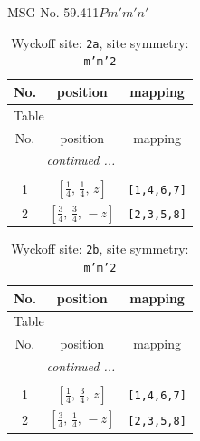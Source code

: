 \documentclass[fleqn,8pt]{jsarticle}
\begin{document}
\setcounter{MaxMatrixCols}{32}

\renewcommand{\tablename}{Table~}
\renewcommand{\figurename}{Figure~}
\begin{center}
\LARGE
MSG No. 59.411\quad$Pm'm'n'$
\end{center}
\renewcommand{\arraystretch}{1.2}
\begin{longtable}{ccc}
\caption{Wyckoff site: {\tt 2a}, site symmetry: {\tt m'm'2}}
 \\
 \hline \hline
No. & position & mapping \\ \hline \endfirsthead

\multicolumn{2}{l}{\tablename\ \thetable{}} \\
 \hline \hline
No. & position & mapping \\ \hline \endhead

 \hline \hline
\multicolumn{2}{r}{\footnotesize\it continued ...} \\ \endfoot

 \hline \hline
\multicolumn{2}{r}{} \\ \endlastfoot

1 & $\left[ \frac{1}{4},\, \frac{1}{4},\, z \right]$ & {\tt [1,4,6,7]} \\ \hline
2 & $\left[ \frac{3}{4},\, \frac{3}{4},\, - z \right]$ & {\tt [2,3,5,8]} \\
\end{longtable}
\renewcommand{\arraystretch}{1.2}
\begin{longtable}{ccc}
\caption{Wyckoff site: {\tt 2b}, site symmetry: {\tt m'm'2}}
 \\
 \hline \hline
No. & position & mapping \\ \hline \endfirsthead

\multicolumn{2}{l}{\tablename\ \thetable{}} \\
 \hline \hline
No. & position & mapping \\ \hline \endhead

 \hline \hline
\multicolumn{2}{r}{\footnotesize\it continued ...} \\ \endfoot

 \hline \hline
\multicolumn{2}{r}{} \\ \endlastfoot

1 & $\left[ \frac{1}{4},\, \frac{3}{4},\, z \right]$ & {\tt [1,4,6,7]} \\ \hline
2 & $\left[ \frac{3}{4},\, \frac{1}{4},\, - z \right]$ & {\tt [2,3,5,8]} \\
\end{longtable}
\end{document}
